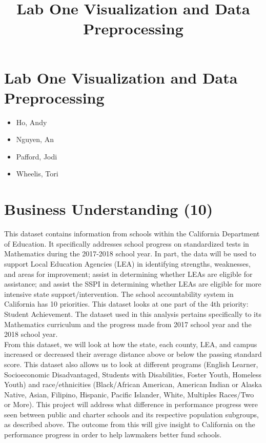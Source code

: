 \documentclass[11pt]{article}
\title{Lab One Visualization and Data Preprocessing}
\providecommand{\tightlist}{%
      \setlength{\itemsep}{0pt}\setlength{\parskip}{0pt}}
\begin{document}
    
    
    \maketitle
    
    

    
    \section{Lab One Visualization and Data
Preprocessing}\label{lab-one-visualization-and-data-preprocessing}

\begin{itemize}
\tightlist
\item
  Ho, Andy
\item
  Nguyen, An
\item
  Pafford, Jodi
\item
  Wheelis, Tori
\end{itemize}

    \section{Business Understanding (10)}\label{business-understanding-10}

This dataset contains information from schools within the California
Department of Education. It specifically addresses school progress on
standardized tests in Mathematics during the 2017-2018 school year. In
part, the data will be used to support Local Education Agencies (LEA) in
identifying strengths, weaknesses, and areas for improvement; assist in
determining whether LEAs are eligible for assistance; and assist the
SSPI in determining whether LEAs are eligible for more intensive state
support/intervention. The school accountability system in California has
10 priorities. This dataset looks at one part of the 4th priority:
Student Achievement. The dataset used in this analysis pertains
specifically to its Mathematics curriculum and the progress made from
2017 school year and the 2018 school year.\\
From this dataset, we will look at how the state, each county, LEA, and
campus increased or decreased their average distance above or below the
passing standard score. This dataset also allows us to look at different
programs (English Learner, Socioeconomic Disadvantaged, Students with
Disabilities, Foster Youth, Homeless Youth) and race/ethnicities
(Black/African American, American Indian or Alaska Native, Asian,
Filipino, Hispanic, Pacific Islander, White, Multiples Races/Two or
More). This project will address what difference in performance progress
were seen between public and charter schools and its respective
population subgroups, as described above. The outcome from this will
give insight to California on the performance progress in order to help
lawmakers better fund schools.
\end{document}
